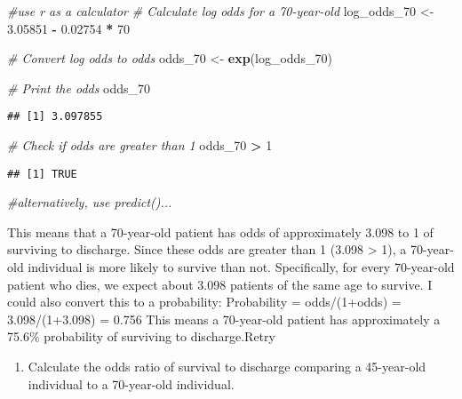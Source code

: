 \documentclass[
]{article}
\newenvironment{Shaded}{\begin{snugshade}}{\end{snugshade}}
\newcommand{\CommentTok}[1]{\textcolor[rgb]{0.56,0.35,0.01}{\textit{#1}}}
\newcommand{\DecValTok}[1]{\textcolor[rgb]{0.00,0.00,0.81}{#1}}
\newcommand{\FloatTok}[1]{\textcolor[rgb]{0.00,0.00,0.81}{#1}}
\newcommand{\FunctionTok}[1]{\textcolor[rgb]{0.13,0.29,0.53}{\textbf{#1}}}
\newcommand{\NormalTok}[1]{#1}
\newcommand{\OtherTok}[1]{\textcolor[rgb]{0.56,0.35,0.01}{#1}}
\newcommand{\SpecialCharTok}[1]{\textcolor[rgb]{0.81,0.36,0.00}{\textbf{#1}}}
\providecommand{\tightlist}{%
  \setlength{\itemsep}{0pt}\setlength{\parskip}{0pt}}
\begin{document}
\begin{Shaded}
\begin{Highlighting}[]
\CommentTok{\#use r as a calculator}
\CommentTok{\# Calculate log odds for a 70{-}year{-}old}
\NormalTok{log\_odds\_70 }\OtherTok{\textless{}{-}} \FloatTok{3.05851} \SpecialCharTok{{-}} \FloatTok{0.02754} \SpecialCharTok{*} \DecValTok{70}

\CommentTok{\# Convert log odds to odds}
\NormalTok{odds\_70 }\OtherTok{\textless{}{-}} \FunctionTok{exp}\NormalTok{(log\_odds\_70)}

\CommentTok{\# Print the odds}
\NormalTok{odds\_70}
\end{Highlighting}
\end{Shaded}

\begin{verbatim}
## [1] 3.097855
\end{verbatim}

\begin{Shaded}
\begin{Highlighting}[]
\CommentTok{\# Check if odds are greater than 1}
\NormalTok{odds\_70 }\SpecialCharTok{\textgreater{}} \DecValTok{1}
\end{Highlighting}
\end{Shaded}

\begin{verbatim}
## [1] TRUE
\end{verbatim}

\begin{Shaded}
\begin{Highlighting}[]
\CommentTok{\#alternatively, use predict()...}
\end{Highlighting}
\end{Shaded}

This means that a 70-year-old patient has odds of approximately 3.098 to
1 of surviving to discharge. Since these odds are greater than 1 (3.098
\textgreater{} 1), a 70-year-old individual is more likely to survive
than not. Specifically, for every 70-year-old patient who dies, we
expect about 3.098 patients of the same age to survive. I could also
convert this to a probability: Probability = odds/(1+odds) =
3.098/(1+3.098) = 0.756 This means a 70-year-old patient has
approximately a 75.6\% probability of surviving to discharge.Retry

\begin{enumerate}
\def\labelenumi{\alph{enumi})}
\setcounter{enumi}{4}
\tightlist
\item
  Calculate the odds ratio of survival to discharge comparing a
  45-year-old individual to a 70-year-old individual.
\end{enumerate}
\end{document}
